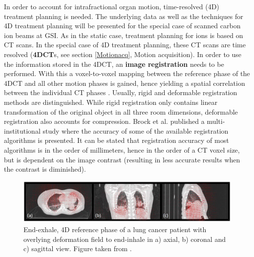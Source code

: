 In order to account for intrafractional organ motion, time-resolved (4D) treatment planning is needed. The underlying data as well 
as the techniques for 4D treatment planning will be presented for the special case of scanned carbon ion beams at GSI.\newline
\newline
As in the static case, treatment planning for ions is based on CT scans. In the special case of 4D treatment planning, these CT scans are 
time resolved (\textbf{4DCT}s, see section \ref{Motionacq}, Motion acquisition). In order to use the information stored in the 4DCT, an \textbf{image 
registration} needs to be performed. With this a voxel-to-voxel mapping between the reference phase of the 4DCT and all other motion phases is 
gained, hence yielding a spatial correlation between the individual CT phases \cite{Ric13}. Usually, rigid and deformable registration 
methods are distinguished. While rigid registration only contains linear transformation of the original object in all three room dimensions, 
deformable registration also accounts for compression. 
Brock et al. \cite{Bro10} published a multi-institutional study where the accuracy of some of the available registration algorithms is 
presented. It can be stated that registration accuracy of most algorithms is in the order of millimeters, hence in the order of a CT 
voxel size, but is dependent on the image contrast (resulting in less accurate results when the contrast is diminished).

\begin{figure}[H]
\begin{center}
\includegraphics[scale=0.43]{./teile/introduction/registration.png}
\caption{End-exhale, 4D reference phase of a lung cancer patient with overlying deformation field to end-inhale in a) axial, b) coronal and 
c) sagittal view. Figure taken from \cite{Ric12}.}
\end{center}
\end{figure}

\vspace*{-0.8cm}

